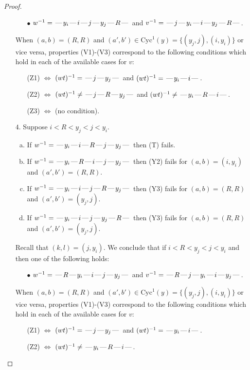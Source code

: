 \documentclass[10pt]{article}
\theoremstyle{definition}
\theoremstyle{definition}
\def\dash{\text{\hspace{0.5mm}---\hspace{0.5mm}}}
\def\Cyc{\mathrm{Cyc}}
\begin{document}
\begin{proof}
\begin{enumerate}
\begin{enumerate}
\item[$\bullet$] $w^{-1} = \dash y_i\dash i\dash j\dash y_j\dash R\dash $ and $v^{-1} = \dash j\dash y_i\dash i\dash y_j\dash R\dash $.
\end{enumerate}
When $(a,b)= (R, R)$ and $(a',b')\in \Cyc^1(y)=\{(y_j,j),(i,y_i)\}$ or vice versa,
properties (V1)-(V3) correspond to the following conditions which hold in
each of the available cases for $v$:
\begin{enumerate}
\item[](Z1) $\Leftrightarrow$ $(wt)^{-1} = \dash j \dash y_j \dash$  and $(wt)^{-1} = \dash y_i \dash i \dash$.
\item[](Z2) $\Leftrightarrow$ $(wt)^{-1} \neq \dash j \dash R \dash y_j \dash$  and $(wt)^{-1} \neq \dash y_i \dash R \dash i \dash$.
\item[](Z3) $\Leftrightarrow$ (no condition).
\end{enumerate}
\item[$4$.] Suppose $i < R < y_j < j < y_i$.
\begin{enumerate}[(a)]
\item If $w^{-1} = \dash y_i\dash i\dash R\dash j\dash y_j\dash $ then (T) fails.
\item If $w^{-1} = \dash y_i\dash R\dash i\dash j\dash y_j\dash $ then (Y2) fails for $(a,b)=(i,y_i)$ and $(a',b')=(R,R)$.
\item If $w^{-1} = \dash y_i\dash i\dash j\dash R\dash y_j\dash $ then (Y3) fails for $(a,b)=(R,R)$ and $(a',b')=(y_j,j)$.
\item If $w^{-1} = \dash y_i\dash i\dash j\dash y_j\dash R\dash $ then (Y3) fails for $(a,b)=(R,R)$ and $(a',b')=(y_j,j)$.
\end{enumerate}
Recall that $(k,l) = (j,y_i)$.
We conclude that if $i < R < y_j < j < y_i$ and then one of the following holds:
\begin{enumerate}
\item[$\bullet$] $w^{-1} = \dash R\dash y_i\dash i\dash j\dash y_j\dash $ and $v^{-1} = \dash R\dash j\dash y_i\dash i\dash y_j\dash $.
\end{enumerate}
When $(a,b)= (R, R)$ and $(a',b')\in \Cyc^1(y)=\{(y_j,j),(i,y_i)\}$ or vice versa,
properties (V1)-(V3) correspond to the following conditions which hold in
each of the available cases for $v$:
\begin{enumerate}
\item[](Z1) $\Leftrightarrow$ $(wt)^{-1} = \dash j \dash y_j \dash$  and $(wt)^{-1} = \dash y_i \dash i \dash$.
\item[](Z2) $\Leftrightarrow$ $(wt)^{-1} \neq \dash y_i \dash R \dash i \dash$.

\end{enumerate}
\end{enumerate}
\end{proof}
\end{document}
